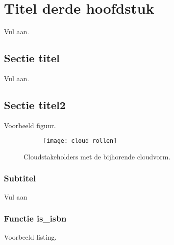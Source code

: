 \chapter{Titel derde hoofdstuk}

Vul aan.


\lipsum[20-24]

\section{Sectie titel}

Vul aan.

\lipsum[32-34]
\section{Sectie titel2}

\lipsum[6-8]

Voorbeeld figuur.

\begin{figure}
	\centering
	\begin{subfigure}{\textwidth}
		\centering
		\centerline{
			\texttt{[image: cloud\_rollen]}
		}
	\end{subfigure}
	\caption{Cloudstakeholders met de bijhorende cloudvorm.}
	\label{fig:cloud_rollen}
\end{figure}

\subsection*{Subtitel}
Vul aan
\subsection{Functie is\_isbn}

Voorbeeld listing.

\begin{code}
\inputminted{python}{isbn.py}
\caption{Functie is\_isbn}
\end{code}